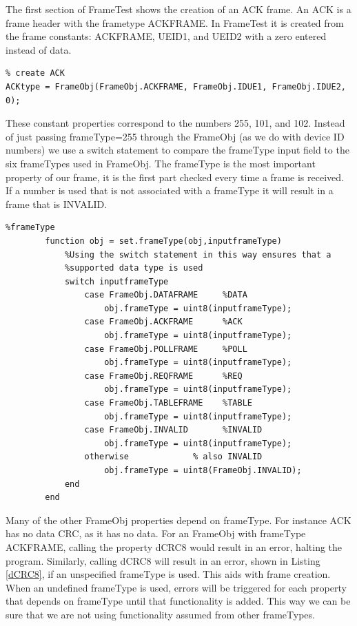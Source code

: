 The first section of FrameTest shows the creation of an ACK frame. An ACK is a frame header with the frametype ACKFRAME. In FrameTest it is created from the frame constants: ACKFRAME, UEID1, and UEID2 with a zero entered instead of data.  
 
\begin{lstlisting}
% create ACK
ACKtype = FrameObj(FrameObj.ACKFRAME, FrameObj.IDUE1, FrameObj.IDUE2, 0);
\end{lstlisting}

These constant properties correspond to the numbers 255, 101, and 102. Instead of just passing frameType=255 through the FrameObj (as we do with device ID numbers) we use a switch statement to compare the frameType input field to the six frameTypes used in FrameObj. The frameType is the most important property of our frame, it is the first part checked every time a frame is received. If a number is used that is not associated with a frameType it will result in a frame that is INVALID.

\begin{lstlisting} 
%frameType
        function obj = set.frameType(obj,inputframeType)
            %Using the switch statement in this way ensures that a
            %supported data type is used
            switch inputframeType
                case FrameObj.DATAFRAME     %DATA
                    obj.frameType = uint8(inputframeType);
                case FrameObj.ACKFRAME      %ACK
                    obj.frameType = uint8(inputframeType);
                case FrameObj.POLLFRAME     %POLL
                    obj.frameType = uint8(inputframeType);
                case FrameObj.REQFRAME      %REQ
                    obj.frameType = uint8(inputframeType);
                case FrameObj.TABLEFRAME    %TABLE
                    obj.frameType = uint8(inputframeType);
                case FrameObj.INVALID       %INVALID
                    obj.frameType = uint8(inputframeType);
                otherwise             % also INVALID
                    obj.frameType = uint8(FrameObj.INVALID);
            end
        end
\end{lstlisting}

Many of the other FrameObj properties depend on frameType. For instance ACK has no data CRC, as it has no data. For an FrameObj with frameType ACKFRAME, calling the property dCRC8 would result in an error, halting the program. Similarly, calling dCRC8 will result in an error, shown in Listing \ref{dCRC8}, if an unspecified frameType is used. This aids with frame creation. When an undefined frameType is used, errors will be triggered for each property that depends on frameType until that functionality is added. This way we can be sure that we are not using functionality assumed from other frameTypes. 

